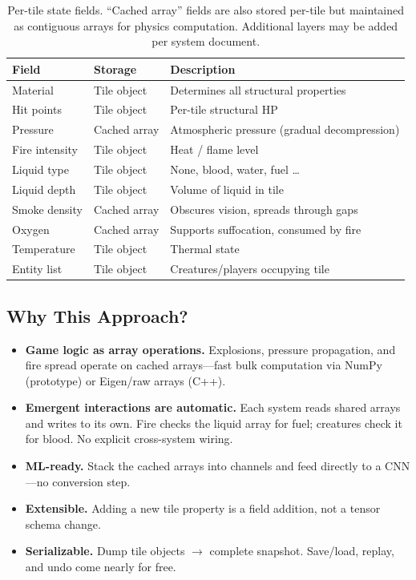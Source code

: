 \documentclass[11pt,a4paper]{article}
\begin{document}
\begin{table}[h]
\centering
\begin{tabular}{@{}lll@{}}
\toprule
\textbf{Field}       & \textbf{Storage}   & \textbf{Description} \\
\midrule
Material             & Tile object         & Determines all structural properties \\
Hit points           & Tile object         & Per-tile structural HP \\
Pressure             & Cached array        & Atmospheric pressure (gradual decompression) \\
Fire intensity       & Tile object         & Heat / flame level \\
Liquid type          & Tile object         & None, blood, water, fuel \ldots \\
Liquid depth         & Tile object         & Volume of liquid in tile \\
Smoke density        & Cached array        & Obscures vision, spreads through gaps \\
Oxygen               & Cached array        & Supports suffocation, consumed by fire \\
Temperature          & Tile object         & Thermal state \\
Entity list          & Tile object         & Creatures/players occupying tile \\
\bottomrule
\end{tabular}
\caption{Per-tile state fields.  ``Cached array'' fields are also
stored per-tile but maintained as contiguous arrays for physics
computation.  Additional layers may be added per system document.}
\label{tab:fields}
\end{table}

\subsection{Why This Approach?}

\begin{itemize}
    \item \textbf{Game logic as array operations.}  Explosions, pressure
          propagation, and fire spread operate on cached arrays---fast
          bulk computation via NumPy (prototype) or Eigen/raw arrays
          (C++).
    \item \textbf{Emergent interactions are automatic.}  Each system
          reads shared arrays and writes to its own.  Fire checks the
          liquid array for fuel; creatures check it for blood.  No
          explicit cross-system wiring.
    \item \textbf{ML-ready.}  Stack the cached arrays into channels and
          feed directly to a CNN---no conversion step.
    \item \textbf{Extensible.}  Adding a new tile property is a field
          addition, not a tensor schema change.
    \item \textbf{Serializable.}  Dump tile objects $\rightarrow$
          complete snapshot.  Save/load, replay, and undo come nearly
          for free.
\end{itemize}
\end{document}

